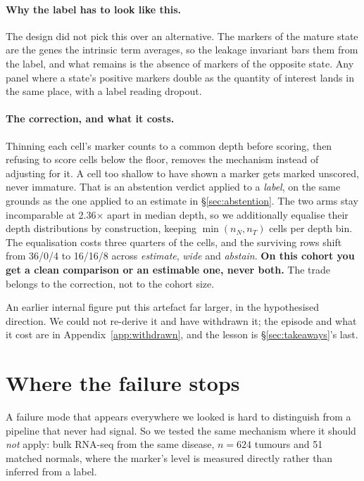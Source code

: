 \documentclass{article}
\begin{document}
\paragraph{Why the label has to look like this.} The design did not pick this
over an alternative. The markers of the mature state are the genes the intrinsic
term averages, so the leakage invariant bars them from the label, and what
remains is the absence of markers of the opposite state. Any panel where a
state's positive markers double as the quantity of interest lands in the same
place, with a label reading dropout.

\paragraph{The correction, and what it costs.} Thinning each cell's marker counts
to a common depth before scoring, then refusing to score cells below the floor,
removes the mechanism instead of adjusting for it. A cell too shallow to have
shown a marker gets marked unscored, never immature. That is an abstention
verdict applied to a \emph{label}, on the same grounds as the one applied to an
estimate in \S\ref{sec:abstention}. The two arms stay incomparable at 2.36$\times$
apart in median depth, so we additionally equalise their depth distributions by
construction, keeping $\min(n_N, n_T)$ cells per depth bin. The equalisation
costs three quarters of the cells, and the surviving rows shift from 36/0/4 to
16/16/8 across \emph{estimate}, \emph{wide} and \emph{abstain}. \textbf{On this
cohort you get a clean comparison or an estimable one, never both.} The trade
belongs to the correction, not to the cohort size.

An earlier internal figure put this artefact far larger, in the hypothesised
direction. We could not re-derive it and have withdrawn it; the episode and what
it cost are in Appendix~\ref{app:withdrawn}, and the lesson is
\S\ref{sec:takeaways}'s last.

\section{Where the failure stops}
\label{sec:boundary}

A failure mode that appears everywhere we looked is hard to distinguish from a
pipeline that never had signal. So we tested the same mechanism where it should
\emph{not} apply: bulk RNA-seq from the same disease, $n = 624$ tumours and 51
matched normals, where the marker's level is measured directly rather than
inferred from a label.
\end{document}
